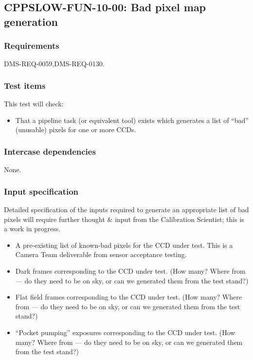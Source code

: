 \subsection{CPPSLOW-FUN-10-00: Bad pixel map generation}
\label{cppslow-fun-10-00}

\subsubsection{Requirements}

DMS-REQ-0059,DMS-REQ-0130.

\subsubsection{Test items}

This test will check:

\begin{itemize}

  \item{That a pipeline task (or equivalent tool) exists which generates a list
  of ``bad'' (unusable) pixels for one or more CCDs.}

\end{itemize}

\subsubsection{Intercase dependencies}

None.

\subsubsection{Input specification}

\begin{note}
Detailed specification of the inputs required to generate an appropriate list of
bad pixels will require further thought \& input from the Calibration Scientist;
this is a work in progress.
\end{note}

\begin{itemize}

  \item{A pre-existing list of known-bad pixels for the CCD under test. This is a Camera Team
  deliverable from sensor acceptance testing.}

  \item{Dark frames corresponding to the CCD under test. (How many? Where from —
  do they need to be on sky, or can we generated them from the test stand?)}

  \item{Flat field frames corresponding to the CCD under test. (How many? Where from —
  do they need to be on sky, or can we generated them from the test stand?)}

  \item{``Pocket pumping'' exposures corresponding to the CCD under test.  (How
  many? Where from — do they need to be on sky, or can we generated them from
  the test stand?)}

\end{itemize}

